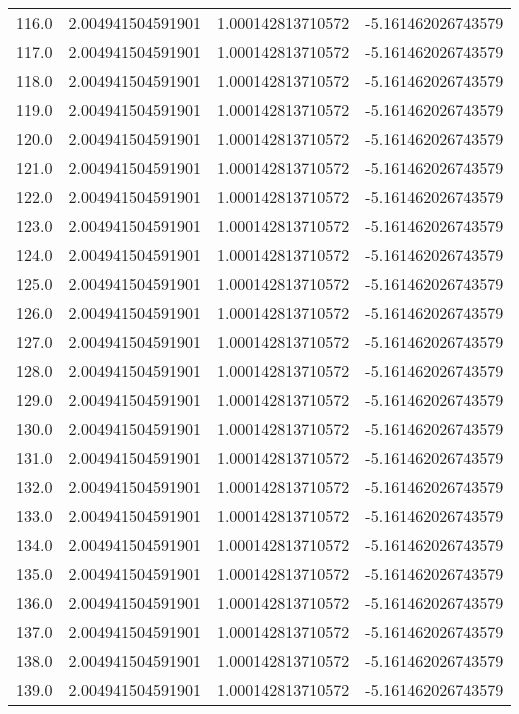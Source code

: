 \begin{longtable}{lrrr}
116.0 & 2.004941504591901 & 1.000142813710572 & -5.161462026743579 \\
117.0 & 2.004941504591901 & 1.000142813710572 & -5.161462026743579 \\
118.0 & 2.004941504591901 & 1.000142813710572 & -5.161462026743579 \\
119.0 & 2.004941504591901 & 1.000142813710572 & -5.161462026743579 \\
120.0 & 2.004941504591901 & 1.000142813710572 & -5.161462026743579 \\
121.0 & 2.004941504591901 & 1.000142813710572 & -5.161462026743579 \\
122.0 & 2.004941504591901 & 1.000142813710572 & -5.161462026743579 \\
123.0 & 2.004941504591901 & 1.000142813710572 & -5.161462026743579 \\
124.0 & 2.004941504591901 & 1.000142813710572 & -5.161462026743579 \\
125.0 & 2.004941504591901 & 1.000142813710572 & -5.161462026743579 \\
126.0 & 2.004941504591901 & 1.000142813710572 & -5.161462026743579 \\
127.0 & 2.004941504591901 & 1.000142813710572 & -5.161462026743579 \\
128.0 & 2.004941504591901 & 1.000142813710572 & -5.161462026743579 \\
129.0 & 2.004941504591901 & 1.000142813710572 & -5.161462026743579 \\
130.0 & 2.004941504591901 & 1.000142813710572 & -5.161462026743579 \\
131.0 & 2.004941504591901 & 1.000142813710572 & -5.161462026743579 \\
132.0 & 2.004941504591901 & 1.000142813710572 & -5.161462026743579 \\
133.0 & 2.004941504591901 & 1.000142813710572 & -5.161462026743579 \\
134.0 & 2.004941504591901 & 1.000142813710572 & -5.161462026743579 \\
135.0 & 2.004941504591901 & 1.000142813710572 & -5.161462026743579 \\
136.0 & 2.004941504591901 & 1.000142813710572 & -5.161462026743579 \\
137.0 & 2.004941504591901 & 1.000142813710572 & -5.161462026743579 \\
138.0 & 2.004941504591901 & 1.000142813710572 & -5.161462026743579 \\
139.0 & 2.004941504591901 & 1.000142813710572 & -5.161462026743579 \\

\end{longtable}

